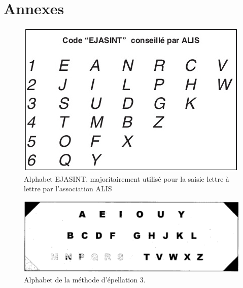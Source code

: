 \documentclass[twoside,twocolumn]{article}
\begin{document}
\nocite{*}



 
%


\clearpage
\newpage

\section*{Annexes}
\begin{center}
\begin{figure}[h!]
  \includegraphics[scale=0.45]{ejasint.jpg}
  \caption{Alphabet EJASINT, majoritairement utilisé pour la saisie lettre à lettre par l'association ALIS}
  \label{ejasint2}
\end{figure}
\end{center}

\begin{center}
\begin{figure}[h!]
  \includegraphics[scale=0.2]{methode3.png}
  \caption{Alphabet de la méthode d'épellation 3.}
  \label{maxi}
\end{figure}
\end{center}
\end{document}
